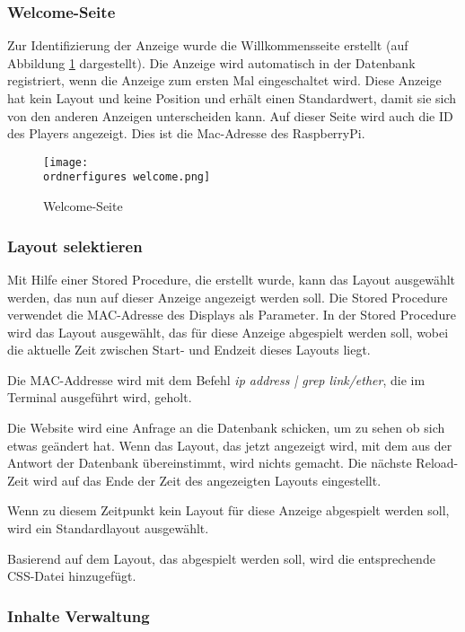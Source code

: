 \subsubsection{Welcome-Seite}
Zur Identifizierung der Anzeige wurde die Willkommensseite  erstellt (auf Abbildung \ref{fi:welcome} dargestellt). Die Anzeige wird automatisch in der Datenbank registriert, wenn die Anzeige zum ersten Mal eingeschaltet wird. Diese Anzeige hat kein Layout und keine Position und erhält einen Standardwert, damit sie sich von den anderen Anzeigen unterscheiden kann. 
Auf dieser Seite wird auch die ID des Players angezeigt. Dies ist die Mac-Adresse des RaspberryPi.
\begin{figure}[H]
	\centering
	\texttt{[image: \\ordnerfigures welcome.png]}
	\caption{Welcome-Seite}
	\label{fi:welcome}
\end{figure} 

\subsubsection{Layout selektieren}

Mit Hilfe einer Stored Procedure, die erstellt wurde, kann das Layout ausgewählt werden, das nun auf dieser Anzeige angezeigt werden soll. Die Stored Procedure verwendet die MAC-Adresse des Displays als Parameter. In der Stored Procedure wird das Layout ausgewählt, das für diese Anzeige abgespielt werden soll, wobei die aktuelle Zeit zwischen Start- und Endzeit dieses Layouts liegt.

Die MAC-Addresse wird mit dem Befehl \textit{ip address | grep link/ether}, die im Terminal ausgeführt wird, geholt.

Die Website wird eine Anfrage an die Datenbank schicken, um zu sehen ob sich etwas geändert hat. Wenn das Layout, das jetzt angezeigt wird, mit dem aus der Antwort der Datenbank übereinstimmt, wird nichts gemacht. Die nächste Reload-Zeit wird auf das Ende der Zeit des angezeigten Layouts eingestellt.

Wenn zu diesem Zeitpunkt kein Layout für diese Anzeige abgespielt werden soll, wird ein Standardlayout ausgewählt.

Basierend auf dem Layout, das abgespielt werden soll, wird die entsprechende CSS-Datei hinzugefügt.

\subsubsection{Inhalte Verwaltung}

